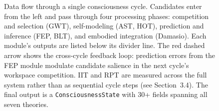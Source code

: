 \begin{figure}[t]
{\begin{tikzpicture}[
    >=Stealth,
    pipe/.style={->, color=gray!70!black, line width=1pt},
    plabel/.style={font=\scriptsize, text=gray!60!black,
                   fill=white, inner sep=1.5pt}
  ]
\end{tikzpicture}%
}%

\caption{Data flow through a single consciousness cycle. Candidates enter from the left
  and pass through four processing phases: competition and selection (GWT),
  self-modeling (AST, HOT), prediction and inference (FEP, BLT), and embodied
  integration (Damasio). Each module's outputs are listed below its divider line.
  The red dashed arrow shows the cross-cycle feedback loop: prediction errors from
  the FEP module modulate candidate salience in the next cycle's workspace
  competition. IIT and RPT are measured across the full system rather than as
  sequential cycle steps (see Section~3.4). The final output is a
  \texttt{ConsciousnessState} with 30+ fields spanning all seven theories.}
\label{fig:cycle}
\end{figure}
